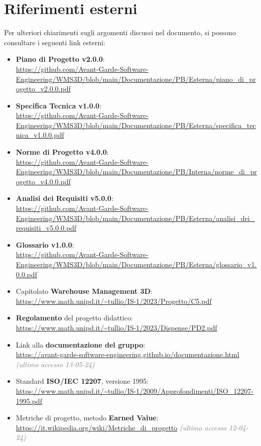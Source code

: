 \section{Riferimenti esterni} \label{sec:riferimenti_esterni}
Per ulteriori chiarimenti sugli argomenti discussi nel documento, si possono consultare i seguenti link esterni:
\begin{itemize}
    \item \textbf{Piano di Progetto v2.0.0}:\\
    \url{https://github.com/Avant-Garde-Software-Engineering/WMS3D/blob/main/Documentazione/PB/Esterna/piano_di_progetto_v2.0.0.pdf}
    \item \textbf{Specifica Tecnica v1.0.0}:\\
    \url{https://github.com/Avant-Garde-Software-Engineering/WMS3D/blob/main/Documentazione/PB/Esterna/specifica_tecnica_v1.0.0.pdf}
    \item \textbf{Norme di Progetto v4.0.0}:\\
    \url{https://github.com/Avant-Garde-Software-Engineering/WMS3D/blob/main/Documentazione/PB/Interna/norme_di_progetto_v4.0.0.pdf}
    \item \textbf{Analisi dei Requisiti v5.0.0}:\\
    \url{https://github.com/Avant-Garde-Software-Engineering/WMS3D/blob/main/Documentazione/PB/Esterna/analisi_dei_requisiti_v5.0.0.pdf}
    \item \textbf{Glossario v1.0.0}:\\
    \url{https://github.com/Avant-Garde-Software-Engineering/WMS3D/blob/main/Documentazione/PB/Esterna/glossario_v1.0.0.pdf}
    \item Capitolato \textbf{Warehouse Management 3D}:\\
    \url{https://www.math.unipd.it/~tullio/IS-1/2023/Progetto/C5.pdf}
    \item \textbf{Regolamento} del progetto didattico:\\
    \url{https://www.math.unipd.it/~tullio/IS-1/2023/Dispense/PD2.pdf}
    \item Link alla \textbf{documentazione del gruppo}:\\
    \url{https://avant-garde-software-engineering.github.io/documentazione.html} \textcolor{gray}{\textit{(ultimo accesso 13-05-24)}}
    \item Standard \textbf{ISO/IEC 12207}, versione 1995:\\
    \url{https://www.math.unipd.it/~tullio/IS-1/2009/Approfondimenti/ISO_12207-1995.pdf}
    \item Metriche di progetto, metodo \textbf{Earned Value}:\\
    \url{https://it.wikipedia.org/wiki/Metriche_di_progetto} \textcolor{gray}{\textit{(ultimo accesso 12-04-24)}}
\end{itemize}